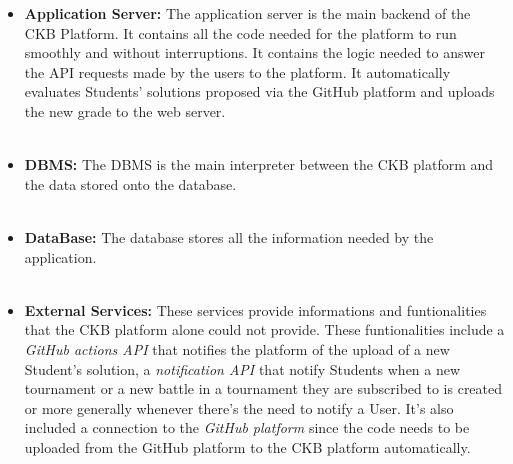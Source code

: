 \documentclass{article}
\begin{document}
{\begin{itemize}
        of seeing their solutions uploaded to the platform in real time. 
        It is the main container for the JavaScript and general backend code for the platform.
        The Web server is connected to the Application server because it needs to be automatically updated when new grades for Students' solutions are generated
        by the platform. \\ \\
        \item \textbf{Application Server:} The application server is the main backend of the CKB Platform. 
        It contains all the code needed for the platform to run smoothly and without interruptions. 
        It contains the logic needed to answer the API requests made by the users to the platform. It
        automatically evaluates Students' solutions proposed via the GitHub platform and uploads the 
        new grade to the web server. \\ \\
        \item \textbf{DBMS:} The DBMS is the main interpreter between the CKB platform and the data 
        stored onto the database. \\ \\
        \item \textbf{DataBase:} The database stores all the information needed by the application. \\ \\
        \item \textbf{External Services:} These services provide informations and funtionalities that 
        the CKB platform alone could not provide.
        These funtionalities include a \textit{GitHub actions API} that notifies the platform of the 
        upload of a new Student's solution, a \textit{notification API} that notify Students when a new 
        tournament or a new battle in a tournament they are subscribed to is created or more generally
        whenever there's the need to notify a User. It's also included a connection to the 
        \textit{GitHub platform} since the code needs to be uploaded from the GitHub platform to the 
        CKB platform automatically. \\
    \end{itemize}
}
\end{document}
